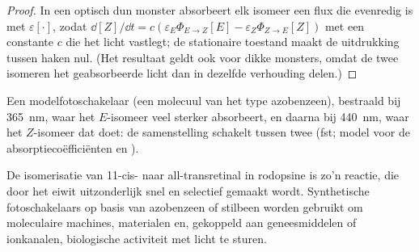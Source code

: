 \begin{proof}
In een optisch dun monster absorbeert elk isomeer een flux die evenredig
is met $\varepsilon[\cdot]$, zodat
$\dd[Z]/\dd t = c(\varepsilon_E\Phi_{E\to Z}[E] - \varepsilon_Z\Phi_{Z\to E}[Z])$ met een constante $c$ die het licht vastlegt;
de stationaire toestand maakt de uitdrukking tussen haken nul. (Het
resultaat geldt ook voor dikke monsters, omdat de twee isomeren het
geabsorbeerde licht dan in dezelfde verhouding delen.)
\end{proof}

\begin{omfigure}

{\small Een modelfotoschakelaar (een molecuul van het type azobenzeen),
bestraald bij \qty{365}{nm}, waar het $E$-isomeer veel sterker absorbeert,
en daarna bij \qty{440}{nm}, waar het $Z$-isomeer dat doet: de
samenstelling schakelt tussen twee  (fst; model
voor de absorptiecoëfficiënten en ).}
\end{omfigure}

De isomerisatie van 11-cis- naar all-transretinal in rodopsine is zo'n
reactie, die door het eiwit uitzonderlijk snel en selectief gemaakt
wordt. Synthetische fotoschakelaars op basis van azobenzeen of stilbeen
worden gebruikt om moleculaire machines, materialen en, gekoppeld aan
geneesmiddelen of ionkanalen, biologische activiteit met licht te sturen.

